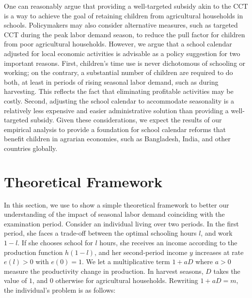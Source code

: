 \documentclass[12pt,letterpaper]{article}
\newcommand{\0}{\ensuremath{\mbox{\boldmath $0$}}}
\begin{document}
One can reasonably argue that providing a well-targeted subsidy akin to the CCT is a way to achieve the goal of retaining children from agricultural households in schools. Policymakers may also consider alternative measures, such as targeted CCT during the peak labor demand season, to reduce the pull factor for children from poor agricultural households. However, we argue that a school calendar adjusted for local economic activities is advisable as a policy suggestion for two important reasons. First, children's time use is never dichotomous of schooling or working; on the contrary, a substantial number of children are required to do both, at least in periods of rising seasonal labor demand, such as during harvesting. This reflects the fact that eliminating profitable activities may be costly. Second, adjusting the school calendar to accommodate seasonality is a relatively less expensive and easier administrative solution than providing a well-targeted subsidy. Given these considerations, we expect the results of our empirical analysis to provide a foundation for school calendar reforms that benefit children in agrarian economies, such as Bangladesh, India, and other countries globally.




\pagebreak

\doublespacing



\pagebreak
\renewcommand{\thefigure}{A\arabic{figure}}
\renewcommand{\theHfigure}{A\arabic{figure}}
\setcounter{figure}{0}

\renewcommand{\thetable}{A\arabic{table}}
\renewcommand{\theHtable}{A\arabic{table}}
\setcounter{table}{0}

\appendix
\setcounter{secnumdepth}{1}
\setcounter{section}{0}
\renewcommand{\thesection}{A\arabic{section}}


\section{Theoretical Framework}\label{app_a1}
\setcounter{equation}{0}
\renewcommand{\theequation}{A\arabic{equation}}

In this section, we use \cite{BalandRobinson2000} to show a simple theoretical framework to better our understanding of the impact of seasonal labor demand coinciding with the examination period. Consider an individual living over two periods. In the first period, she faces a trade-off between the optimal schooling hours $l$, and work $1-l$. If she chooses school for $l$ hours, she receives an income according to the production function $h(1-l)$, and her second-period income $y$ increases at rate $e(l)>0$ with $e(0) = 1$. We let a multiplicative term $1+aD$ where $a>0$ 	measure the productivity change in production. In harvest seasons, $D$ takes the value of $1$, and $0$ otherwise for agricultural households. Rewriting $1+aD = m$, the individual's problem is as follows:
\end{document}
